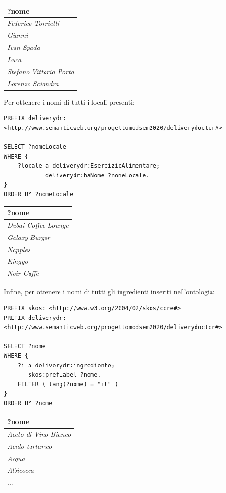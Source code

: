 \documentclass[12pt]{article}
\begin{document}
\begin{tabularx}{\textwidth} { 
  | >{\centering\arraybackslash}X |}
 \hline
 \textbf{?nome} \\
 \hline
 \textit{Federico Torrielli} \\
 \hline
 \textit{Gianni} \\
 \hline
 \textit{Ivan Spada} \\
 \hline
 \textit{Luca} \\
 \hline
 \textit{Stefano Vittorio Porta} \\
 \hline
 \textit{Lorenzo Sciandra} \\
\hline
\end{tabularx}
\newline
\newline
Per ottenere i nomi di tutti i locali presenti:
\begin{lstlisting}[language=SPARQL]
PREFIX deliverydr: 
<http://www.semanticweb.org/progettomodsem2020/deliverydoctor#>

SELECT ?nomeLocale
WHERE {
    ?locale a deliverydr:EsercizioAlimentare;
            deliverydr:haNome ?nomeLocale.
}
ORDER BY ?nomeLocale
\end{lstlisting}
\begin{tabularx}{\textwidth} { 
  | >{\centering\arraybackslash}X |}
 \hline
 \textbf{?nome} \\
 \hline
 \textit{Dubai Coffee Lounge} \\
 \hline
 \textit{Galaxy Burger} \\
 \hline
 \textit{Napples} \\
 \hline
 \textit{Kingyo} \\
 \hline
 \textit{Noir Caffè} \\
\hline
\end{tabularx}
\newline
\newline

Infine, per ottenere i nomi di tutti gli ingredienti inseriti nell'ontologia:
\begin{lstlisting}[language=SPARQL]
PREFIX skos: <http://www.w3.org/2004/02/skos/core#>
PREFIX deliverydr: 
<http://www.semanticweb.org/progettomodsem2020/deliverydoctor#>

SELECT ?nome
WHERE {
    ?i a deliverydr:ingrediente;
       skos:prefLabel ?nome.
    FILTER ( lang(?nome) = "it" )
}
ORDER BY ?nome
\end{lstlisting}
\begin{tabularx}{\textwidth} { 
  | >{\centering\arraybackslash}X |}
 \hline
 \textbf{?nome} \\
 \hline
 \textit{Aceto di Vino Bianco} \\
 \hline
 \textit{Acido tartarico} \\
 \hline
 \textit{Acqua} \\
 \hline
 \textit{Albicocca} \\
 \hline
 ... \\
\hline
\end{tabularx}
\end{document}
